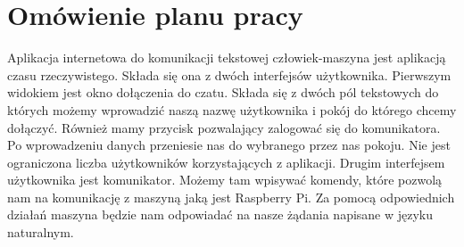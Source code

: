 \section{Omówienie planu pracy}
Aplikacja internetowa do komunikacji tekstowej człowiek-maszyna jest aplikacją czasu rzeczywistego. Składa się ona z dwóch interfejsów użytkownika. Pierwszym widokiem jest okno dołączenia do czatu. Składa się z dwóch pól tekstowych do których możemy wprowadzić naszą nazwę użytkownika i pokój do którego chcemy dołączyć. Również mamy przycisk pozwalający zalogować się do komunikatora. Po wprowadzeniu danych przeniesie nas do wybranego przez nas pokoju. Nie jest ograniczona liczba użytkowników korzystających z aplikacji. 
Drugim interfejsem użytkownika jest komunikator. Możemy tam wpisywać komendy, które pozwolą nam na komunikację z maszyną jaką jest Raspberry Pi. Za pomocą odpowiednich działań maszyna będzie nam odpowiadać na nasze żądania napisane w języku naturalnym. 
